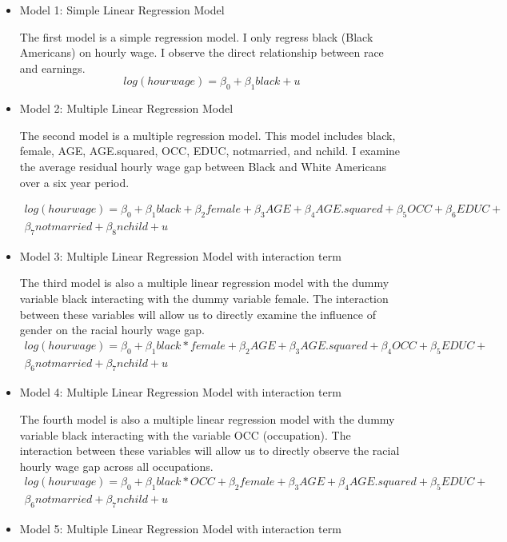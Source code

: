 \documentclass[12pt, english]{article}
\begin{document}
    \begin{itemize}
        \item Model 1: Simple Linear Regression Model
        
        The first model is a simple regression model. I only regress black (Black Americans) on hourly wage. I observe the direct relationship between race and earnings.
        \begin{equation}
        log(hourwage) = \beta_0 + \beta_1black + u
        \end{equation}
        
        \item Model 2: Multiple Linear Regression Model
        
        The second model is a multiple regression model. This model includes black, female, AGE, AGE.squared, OCC, EDUC, notmarried, and nchild. I examine the average residual hourly wage gap between Black and White Americans over a six year period.
        
\begin{multline}
log(hourwage) = \beta_0 + \beta_1black + \beta_2female + \beta_3AGE + \beta_4AGE.squared + \beta_5OCC + \beta_6EDUC +\\ \beta_7notmarried + \beta_8nchild + u
\end{multline}
        \item Model 3: Multiple Linear Regression Model with interaction term
        
        The third model is also a multiple linear regression model with the dummy variable black interacting with the dummy variable female. The interaction between these variables will allow us to directly examine the influence of gender on the racial hourly wage gap. 
        \begin{multline*}
            log(hourwage) = \beta_0 + \beta_1black*female + \beta_2AGE
            + \beta_3AGE.squared + \beta_4OCC + \beta_5EDUC +\\ \beta_6notmarried + \beta_7nchild + u
        \end{multline*}
        \item Model 4: Multiple Linear Regression Model with interaction term
        
        The fourth model is also a multiple linear regression model with the dummy variable black interacting with the variable OCC (occupation). The interaction between these variables will allow us to directly observe the racial hourly wage gap across all occupations.
        \begin{multline*}
            log(hourwage) = \beta_0 + \beta_1black*OCC + \beta_2female + \beta_3AGE + \beta_4AGE.squared + \beta_5EDUC +\\ \beta_6notmarried + \beta_7nchild + u
        \end{multline*}
        \item Model 5: Multiple Linear Regression Model with interaction term


\end{itemize}
\end{document}
